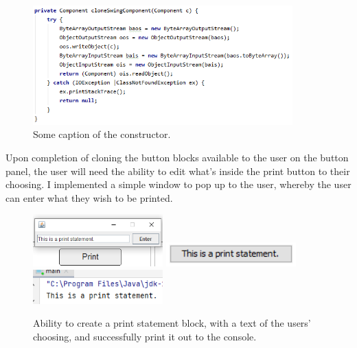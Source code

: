 \documentclass[a4paper, 12pt]{article}
\begin{document}
            \begin{figure}[h]
                \centering
                \includegraphics[width=100mm]{copy_constructor.png}
                \caption{Some caption of the constructor.}
            \end{figure}
        
            Upon completion of cloning the button blocks available to the user on the button panel,
            the user will need the ability to edit what's inside the print button to their choosing.
            I implemented a simple window to pop up to the user, whereby the user can enter what they
            wish to be printed.

            \begin{figure}[h]
                \includegraphics[width=50mm]{print_statement1.png}
                \includegraphics[width=50mm]{print_statement2.png}
                \includegraphics[width=50mm]{print_statement3.png}
                \caption{Ability to create a print statement block, with a text of the users' choosing,
                and successfully print it out to the console.}
            \end{figure}

        \clearpage
\end{document}
